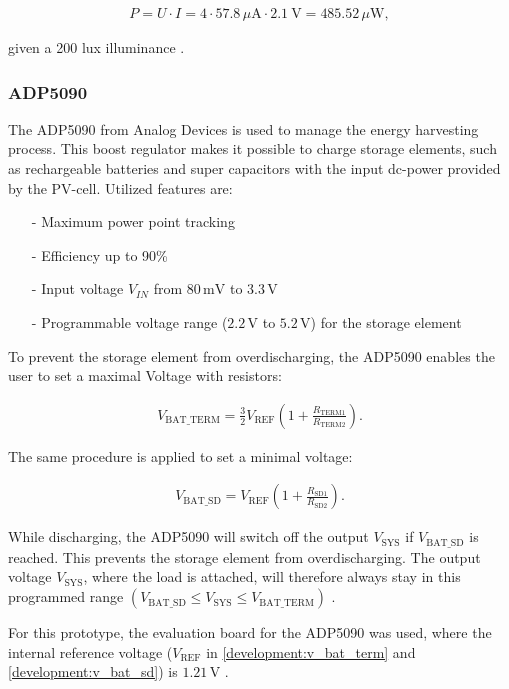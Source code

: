\begin{align}
	P = U\cdot I = 4\cdot 57.8\,\mu\text{A}\cdot 2.1\ \text{V}=485.52\,\mu \text{W},\label{development:cell_power}
\end{align}

given a 200 lux illuminance \cite{amorton}.

\subsubsection{ADP5090}
The ADP5090 from Analog Devices is used to manage the energy harvesting process.
This boost regulator makes it possible to charge storage elements, such as rechargeable batteries and super capacitors with the input dc-power provided by the PV-cell. Utilized features are:
\begin{itemize}
	\item[-] Maximum power point tracking
	\item[-] Efficiency up to 90\%
	\item[-] Input voltage $V_{IN}$ from $80\,\text{mV}$ to $3.3\,\text{V}$
	\item[-] Programmable voltage range ($2.2\,\text{V}$ to $5.2\,\text{V}$) for the storage element
\end{itemize}
To prevent the storage element from overdischarging, the ADP5090 enables the user to set a maximal Voltage with resistors:

\begin{align}
	V_{\text{BAT\_TERM}} = \frac{3}{2} V_{\text{REF}}\left(1+\frac{R_{\text{TERM1}}}{R_{\text{TERM2}}} \right).\label{development:v_bat_term} 
\end{align} 

The same procedure is applied to set a minimal voltage:

\begin{align}
	V_{\text{BAT\_SD}}=V_{\text{REF}} \left(1+\frac{R_{\text{SD1}}}{R_{\text{SD2}}} \right).\label{development:v_bat_sd} 
\end{align}  

While discharging, the ADP5090 will switch off the output $V_{\text{SYS}}$ if $V_{\text{BAT\_SD}}$ is reached. This prevents the storage element from overdischarging.
The output voltage $V_{\text{SYS}}$, where the load is attached, will therefore always stay in this programmed range $(V_{\text{BAT\_SD}}\le V_{\text{SYS}}\le V_{\text{BAT\_TERM}})$ \cite{adp}.

For this prototype, the evaluation board for the ADP5090 was used, where the internal reference voltage ($V_{\text{REF}}$ in \eqref{development:v_bat_term} and \eqref{development:v_bat_sd}) is $1.21\,\text{V}$ \cite{adp_eval}.

